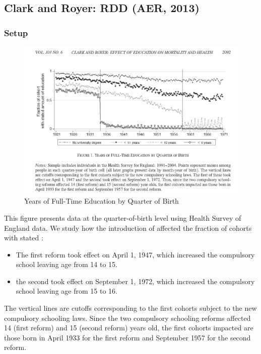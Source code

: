     \subsection{Clark and Royer: RDD (AER, 2013)}\label{clark_royer_RDD}
    
        \subsubsection{Setup}
            \begin{figure}[H]
                \centering
                \includegraphics[width=5in]{images/ch3/35.png}
                \caption{Years of Full-Time Education by Quarter of Birth}
            \end{figure}
            This figure presents data at the quarter-of-birth level using Health Survey of England data. We study how the introduction of  affected the fraction of cohorts with stated :
            \begin{itemize}
                \item The first reform took effect on April 1, 1947, which increased the compulsory school leaving age from 14 to 15.
                \item the second took effect on September 1, 1972, which increased the compulsory school leaving age from 15 to 16.
            \end{itemize}
            The vertical lines are cutoffs corresponding to the first cohorts subject to the new compulsory schooling laws. Since the two compulsory schooling reforms affected 14 (first reform) and 15 (second reform) years old, the first cohorts impacted are those born in April 1933 for the first reform and September 1957 for the second reform.
                     
